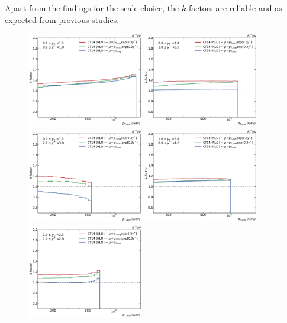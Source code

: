 Apart from the findings for the \ptavg scale choice, the $k$-factors are
reliable and as expected from previous studies.

\begin{figure}[htp]
    \centering
    \includegraphics[width=0.45\textwidth]{figures/theory/kfactor_comp_yb0ys0.pdf}\hfill
    \includegraphics[width=0.45\textwidth]{figures/theory/kfactor_comp_yb0ys1.pdf}
    \includegraphics[width=0.45\textwidth]{figures/theory/kfactor_comp_yb0ys2.pdf}\hfill
    \includegraphics[width=0.45\textwidth]{figures/theory/kfactor_comp_yb1ys0.pdf}
    \includegraphics[width=0.45\textwidth]{figures/theory/kfactor_comp_yb1ys1.pdf}\hfill

\end{figure}
